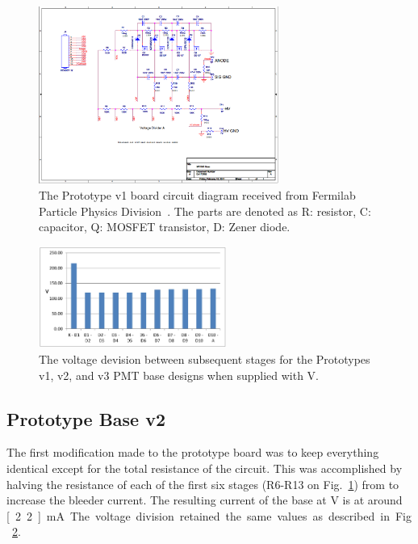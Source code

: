 \begin{figure}
	\centerline{
		\mbox{\includegraphics[width=0.7\textwidth]{figures/newbase.png}}
	}
	\caption{The Prototype v1 board circuit diagram received from Fermilab Particle Physics Division~\cite{pc:sten}. The parts are denoted as R: resistor, C: capacitor, Q: MOSFET transistor, D: Zener diode.}
	\label{fig:v1-board}
\end{figure}

\begin{figure}
	\centerline{
		\mbox{\includegraphics[width=0.55\textwidth]{figures/v123-volt.jpg}}
	}
	\caption{The voltage devision between subsequent stages for the Prototypes v1, v2, and v3 PMT base designs  when supplied with \unit[-1500]{V}.}
	\label{fig:v123-volt}
\end{figure}

\subsection{Prototype Base v2}

The first modification made to the prototype board was to keep everything identical except for the total resistance of the circuit. This was accomplished by halving the resistance of each of the first six stages (R6-R13 on Fig.~\ref{fig:v1-board}) from to increase the bleeder current. The resulting current of the base at \unit[-1500]{V} is at around \unit[2.2]{mA}. The voltage division retained the same values as described in Fig.~\ref{fig:v123-volt}.

